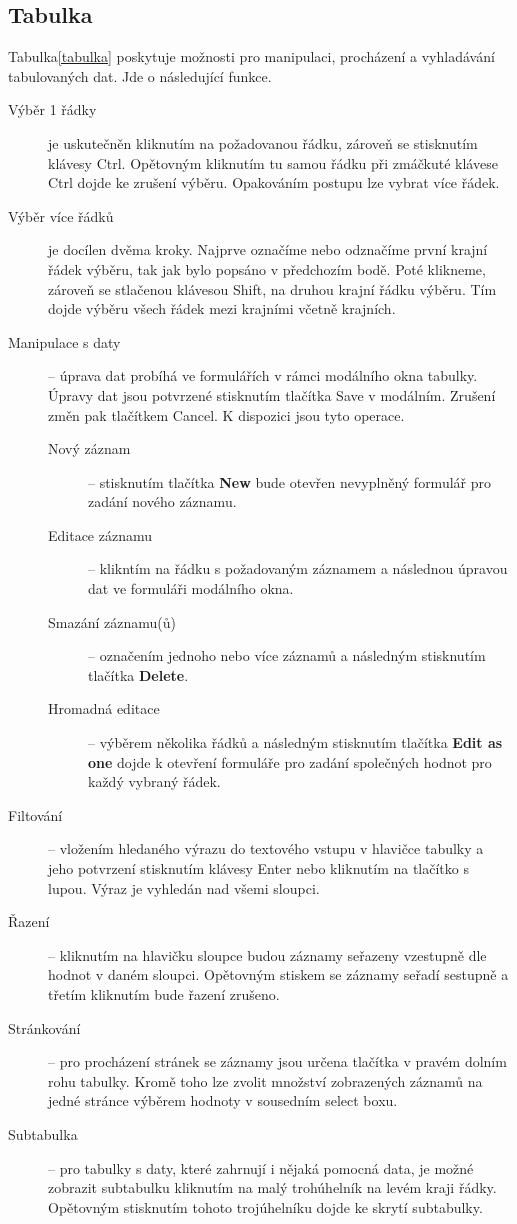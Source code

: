 \documentclass[thesis=B,czech]{FITthesis}[2012/06/26]
\begin{document}
\subsection{Tabulka}
	Tabulka\ref{tabulka} poskytuje možnosti pro manipulaci, procházení a vyhladávání tabulovaných dat. Jde o následující funkce.
	\begin{description}
		\item[Výběr 1 řádky] je uskutečněn kliknutím na požadovanou řádku, zároveň se stisknutím klávesy Ctrl. Opětovným kliknutím tu samou řádku při zmáčkuté klávese Ctrl dojde ke zrušení výběru. Opakováním postupu lze vybrat více řádek.
		\item[Výběr více řádků] je docílen dvěma kroky. Najprve označíme nebo odznačíme první krajní řádek výběru, tak jak bylo popsáno v předchozím bodě. Poté klikneme, zároveň se stlačenou klávesou Shift, na druhou krajní řádku výběru. Tím dojde výběru všech řádek mezi krajními včetně krajních.
		\item[Manipulace s daty] -- úprava dat probíhá ve formulářích v rámci modálního okna tabulky. Úpravy dat jsou potvrzené stisknutím tlačítka Save v modálním. Zrušení změn pak tlačítkem Cancel. K dispozici jsou tyto operace.
			\begin{description}
				\item[Nový záznam] -- stisknutím tlačítka \textbf{New} bude otevřen nevyplněný formulář pro zadání nového záznamu.
				\item[Editace záznamu] -- klikntím na řádku s požadovaným záznamem a následnou úpravou dat ve formuláři modálního okna.
				\item[Smazání záznamu(ů)] -- označením jednoho nebo více záznamů a následným stisknutím tlačítka \textbf{Delete}.
				\item[Hromadná editace] -- výběrem několika řádků a následným stisknutím tlačítka \textbf{Edit as one} dojde k otevření formuláře pro zadání společných hodnot pro každý vybraný řádek.
			\end{description}
		\item[Filtování] -- vložením hledaného výrazu do textového vstupu v hlavičce tabulky a jeho potvrzení stisknutím klávesy Enter nebo kliknutím na tlačítko s lupou. Výraz je vyhledán nad všemi sloupci.
		\item[Řazení] -- kliknutím na hlavičku sloupce budou záznamy seřazeny vzestupně dle hodnot v daném sloupci. Opětovným stiskem se záznamy seřadí sestupně a třetím kliknutím bude řazení zrušeno.
		\item[Stránkování] -- pro procházení stránek se záznamy jsou určena tlačítka v pravém dolním rohu tabulky. Kromě toho lze zvolit množství zobrazených záznamů na jedné stránce výběrem hodnoty v sousedním select boxu.
		\item[Subtabulka] -- pro tabulky s daty, které zahrnují i nějaká pomocná data, je možné zobrazit subtabulku kliknutím na malý trohúhelník na levém kraji řádky. Opětovným stisknutím tohoto trojúhelníku dojde ke skrytí subtabulky.
	\end{description}
\end{document}
